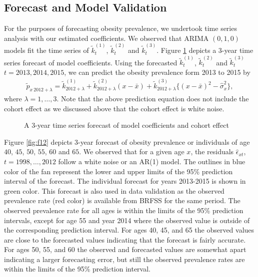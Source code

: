 \documentclass[11pt,letterpaper]{article}
\numberwithin{equation}{section}
\begin{document}
\subsection{Forecast and Model Validation}
For the purposes of forecasting obesity prevalence, we undertook time series analysis with our estimated coefficients. We observed that  ARIMA $(0,1,0)$ models fit the time series of $\tilde{k}_t^{(1)}$, $\tilde{k}_t^{(2)}$ and  $\tilde{k}_t^{(3)}$.
Figure \ref{fig:f10}  depicts a 3-year time series forecast of model coefficients. Using the forecasted $\tilde{k}_t^{(1)}$, $\tilde{k}_t^{(2)}$ and $\tilde{k}_t^{(3)}$ $t=2013,2014,2015$, we can predict the  obesity prevalence form 2013 to 2015 by
\begin{eqnarray*}
\tilde{p}_{x~2012+\lambda}=\tilde{k}_{2012+\lambda}^{(1)}+ \tilde{k}_{2012+\lambda}^{(2)}(x - \bar{x}) + \tilde{k}_{2012+\lambda}^{(3)}\{(x - \bar{x})^{2} - \hat\sigma_x^{2}\},
\end{eqnarray*}
where $\lambda=1,\dots,3$. Note that the above prediction equation does not include the cohort effect as we discussed above that the cohort effect is white noise.
\begin{figure}
\begin{center}
{}
\caption{\label{fig:f10} A 3-year time series forecast of model coefficients and cohort effect}
\end{center}
\end{figure}

Figure \ref{fig:f12} depicts 3-year forecast of obesity prevalence or individuals of age $40$, $45$, $50$, $55$, $60$ and $65$. We observed that for a given age $x$, the residuals $\hat\epsilon_{xt}$, $t=1998,\dots,2012$ follow a white noise or an AR(1) model. The outlines in blue color of the fan represent the lower and upper limits of the 95\% prediction interval of the forecast. The individual forecast for years 2013-2015 is shown in green color. This forecast is also used in data validation as the observed prevalence rate (red color) is available from BRFSS for the same period. The observed prevalence rate for all ages is within the limits of the 95\% prediction intervals, except for age 55 and year 2014 where the observed value is outside of the corresponding prediction interval. For ages 40, 45, and 65 the observed values are close to the forecasted values indicating that the forecast is fairly accurate. For ages 50, 55, and 60 the observed and forecasted values are somewhat apart indicating a larger forecasting error, but still the observed prevalence rates are within the limits of the 95\% prediction interval.
\end{document}
